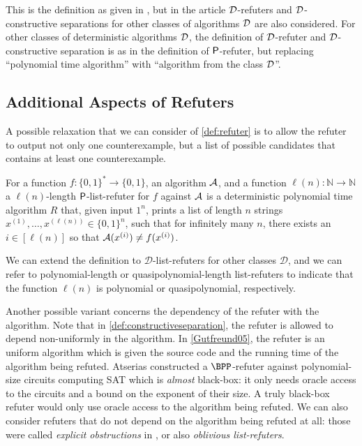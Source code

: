 This is the definition as given in \cite[Definition 1.1]{ConstructiveSeparations}, but in the article
$\mathcal{D}$-refuters and $\mathcal{D}$-constructive separations for other classes of algorithms $\mathcal{D}$ are also considered.
For other classes of deterministic algorithms $\mathcal{D}$, the definition of $\mathcal{D}$-refuter and $\mathcal{D}$-constructive 
separation is as in the definition of $\mathsf{P}$-refuter, but replacing ``polynomial time algorithm''
with ``algorithm from the class $\mathcal{D}$''.

\subsection{Additional Aspects of Refuters}

A possible relaxation that we can consider of \cref{def:refuter} is to allow the refuter 
to output not only one counterexample, but a list of possible candidates that contains
at least one counterexample.

\begin{definition}
	For a function $f \colon \{0, 1\}^* \to \{0, 1\}$, an algorithm $\mathcal{A}$,
	and a function $\ell(n) \colon \mathbb{N} \to \mathbb{N}$ 
	a $\ell(n)$-length $\mathsf{P}$-list-refuter for $f$ against $\mathcal{A}$ is a deterministic polynomial time
	algorithm $R$ that, given input $1^n$, prints a list of length $n$ strings
	$x^{(1)}, \ldots, x^{(\ell(n))} \in \{0, 1\}^n$,
	such that for infinitely many $n$, there exists an $i \in [\ell(n)]$ so that 
	$\mathcal{A}(x^{(i)}) \neq f(x^{(i)})$.
\end{definition}

We can extend the definition to $\mathcal{D}$-list-refuters for other classes $\mathcal{D}$,
and we can refer to polynomial-length or quasipolynomial-length list-refuters to indicate that 
the function $\ell(n)$ is polynomial or quasipolynomial, respectively. 

Another possible variant concerns the dependency of the refuter with the algorithm. 
Note that in \cref{def:constructiveseparation}, the refuter is allowed to 
depend non-uniformly in the algorithm. In \cref{Gutfreund05}, the refuter is an uniform
algorithm which is given the source code and the running time of the algorithm being refuted. 
Atserias \cite{Atserias06} constructed a $\BPP$-refuter against polynomial-size circuits 
computing SAT which is \emph{almost} black-box: it only needs oracle access to the circuits
and a bound on the exponent of their size. A truly black-box refuter would only use oracle 
access to the algorithm being refuted. We can also consider refuters that do not depend on the 
algorithm being refuted at all: those were called \emph{explicit obstructions} in \cite{Chen20},
or also \emph{oblivious list-refuters}.

